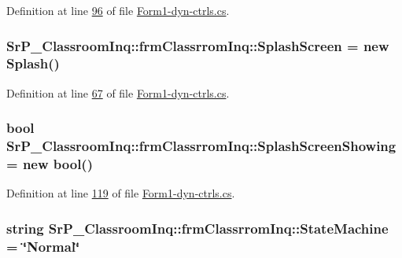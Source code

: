 \-Definition at line \hyperlink{_form1-dyn-ctrls_8cs_source_l00096}{96} of file \hyperlink{_form1-dyn-ctrls_8cs_source}{\-Form1-\/dyn-\/ctrls.\-cs}.

\hypertarget{class_sr_p___classroom_inq_1_1frm_classrrom_inq_a98e4b48609bbf222068559db81f53f9d}{
\subsubsection[{\-Splash\-Screen}]{ {\bf \-Sr\-P\-\_\-\-Classroom\-Inq\-::frm\-Classrrom\-Inq\-::\-Splash\-Screen} = new {\bf \-Splash}()}}
\label{class_sr_p___classroom_inq_1_1frm_classrrom_inq_a98e4b48609bbf222068559db81f53f9d}


\-Definition at line \hyperlink{_form1-dyn-ctrls_8cs_source_l00067}{67} of file \hyperlink{_form1-dyn-ctrls_8cs_source}{\-Form1-\/dyn-\/ctrls.\-cs}.

\hypertarget{class_sr_p___classroom_inq_1_1frm_classrrom_inq_a7e52871d9da2c0a9364fd22a8743d7bd}{
\subsubsection[{\-Splash\-Screen\-Showing}]{\setlength{\rightskip}{0pt plus 5cm}bool {\bf \-Sr\-P\-\_\-\-Classroom\-Inq\-::frm\-Classrrom\-Inq\-::\-Splash\-Screen\-Showing} = new bool()}}
\label{class_sr_p___classroom_inq_1_1frm_classrrom_inq_a7e52871d9da2c0a9364fd22a8743d7bd}


\-Definition at line \hyperlink{_form1-dyn-ctrls_8cs_source_l00119}{119} of file \hyperlink{_form1-dyn-ctrls_8cs_source}{\-Form1-\/dyn-\/ctrls.\-cs}.

\hypertarget{class_sr_p___classroom_inq_1_1frm_classrrom_inq_a4858c67d60a267f02e6c97085f2aee71}{
\subsubsection[{\-State\-Machine}]{\setlength{\rightskip}{0pt plus 5cm}string {\bf \-Sr\-P\-\_\-\-Classroom\-Inq\-::frm\-Classrrom\-Inq\-::\-State\-Machine} = \char`\"{}\-Normal\char`\"{}}}
\label{class_sr_p___classroom_inq_1_1frm_classrrom_inq_a4858c67d60a267f02e6c97085f2aee71}


